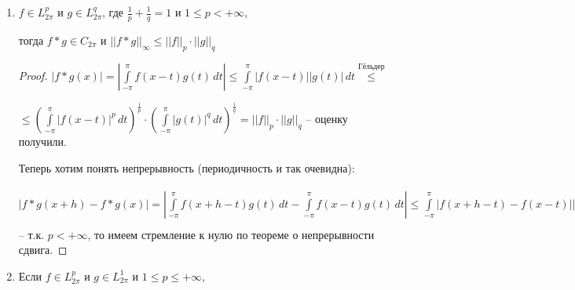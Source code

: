 \begin{properties}
\begin{enumerate}
{            \begin{proof}
                $c_k (f * g) = \frac{1}{2\pi} \int\limits_{-\pi}^\pi e^{-ikx} f*g (x) \, dx = \frac{1}{2\pi} \int\limits_{-\pi}^\pi e^{-ikx} \int\limits_{-\pi}^\pi f(x - t) g(t) \, dt \, dx = \\ 
                = \frac{1}{2\pi} \int\limits_{-\pi}^\pi \int\limits_{-\pi}^\pi e^{-ik(x - t)}e^{-ikt} f(x - t) g(t) \, dt \, dx = 
                \frac{1}{2\pi} \int\limits_{-\pi}^\pi e^{-ikt} g(t) \int\limits_{-\pi}^\pi e^{-ik(x - t)} f(\underbrace{x - t}_{=s}) \, dx \, dt = \\
                = \frac{1}{2\pi} \int\limits_{-\pi}^\pi e^{-ikt} g(t) \int\limits_{x-\pi}^{x+\pi} e^{-iks} f(s) \, ds \, dt  = c_k (f) \int\limits_{-\pi}^\pi e^{-ikt} g(t) \, dt = 2\pi \cdot c_k(f) \cdot c_k(g)$
            \end{proof}
        }
        \item {
            $f \in L_{2\pi}^p$ и $g \in L_{2\pi}^q$, где $\frac{1}{p} + \frac{1}{q} = 1$ и $1 \leq p < +\infty$,

            тогда $f * g \in C_{2\pi}$ и $||f * g||_{\infty} \leqslant ||f||_p \cdot ||g||_q$

            \begin{proof}
                $|f*g (x)| = \left|\int\limits_{-\pi}^\pi f(x - t) g(t) \, dt \right| \leqslant \int\limits_{-\pi}^\pi |f(x-t)||g(t)| \, dt \overset{\text{Гёльдер}}{\leqslant}$
                
                $\leqslant \left( \int\limits_{-\pi}^\pi |f(x - t)|^p \, dt \right)^{\frac{1}{p}} \cdot \left( \int\limits_{-\pi}^\pi |g(t)|^q \, dt \right)^{\frac{1}{q}} = ||f||_p \cdot ||g||_q$ -- оценку получили.

                Теперь хотим понять непрерывность (периодичность и так очевидна):
                
                $|f * g(x + h) - f * g (x)| = \left| \int\limits_{-\pi}^\pi f(x + h -t)g(t) \, dt - \int\limits_{-\pi}^\pi f(x - t)g(t) \, dt \right| \leqslant \int\limits_{-\pi}^\pi |f(x + h - t) - f(x - t)||g(t)| \, dt \leqslant 
                \left( \int\limits_{-\pi}^\pi|f(x + h - t - f(x - t))|^p \, dt \right)^{\frac{1}{p}} ||g||_q = \left( \int\limits_{-\pi}^\pi |f(s + h) - f(s)|^p \, ds \right)^{\frac{1}{p}} \cdot ||g||_q = \underbrace{||f_h - f||_p}_{\rightarrow 0} ||g||_q$ -- т.к. $p < +\infty$, то имеем стремление к нулю по теореме о непрерывности сдвига.
            \end{proof}
        }
        \item {
            Если $f \in L_{2\pi}^p$ и $g \in L_{2\pi}^1$ и $1 \leq p \leq +\infty$,

}
\end{enumerate}
\end{properties}
